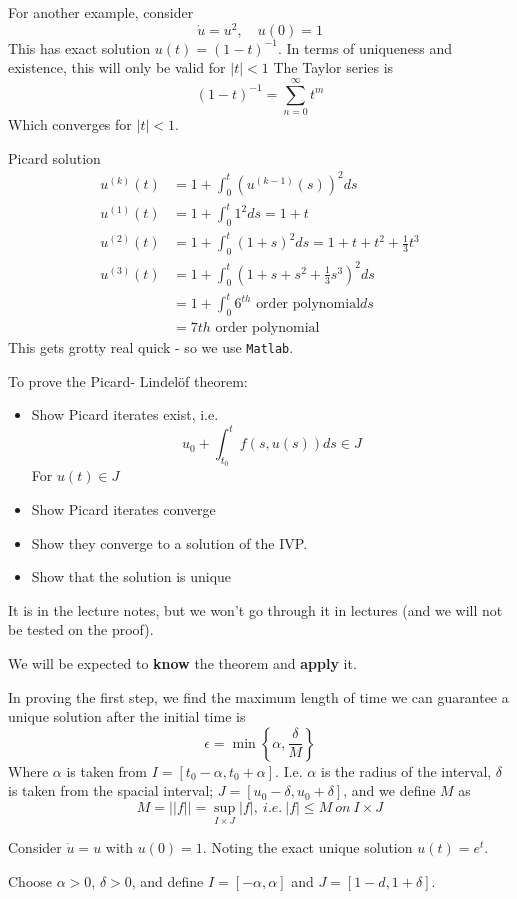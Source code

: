 \documentclass{/home/janmebows/Documents/LatexTemplates/myassignment}
\begin{document}
For another example, consider 
\[\dot u = u^2,\quad u(0)=1\]
This has exact solution $u(t) = (1-t)^{-1}$.
In terms of uniqueness and existence, this will only be valid for $|t| <1$
The Taylor series is
\[(1-t)^{-1} = \sum_{n=0}^\infty t^m\]
Which converges for $|t|<1$.

Picard solution
\begin{align*}
    u^{(k)}(t) &= 1 + \int_0^t \left(u^{(k-1)}(s)\right)^2 ds\\
    u^{(1)}(t) &= 1 + \int_0^t 1^2 ds = 1 + t\\
    u^{(2)}(t) &= 1 + \int_0^t (1+s)^2 ds = 1 + t + t^2 + \frac13 t^3\\
    u^{(3)}(t) &= 1 + \int_0^t (1+s+s^2+\frac13 s^3)^2 ds\\
            &= 1 +\int_0^t 6^{th}\text{ order polynomial} ds\\
            &= 7{th}\text{ order polynomial}
\end{align*}
This gets grotty real quick - so we use \verb|Matlab|.

To prove the Picard- Lindel\"of theorem:
\begin{itemize}
    \item Show Picard iterates exist, i.e. 
    \[u_0 + \int_{t_0}^t f(s,u(s)) ds \in J\] 
    For $u(t) \in J$
    \item Show Picard iterates converge
    \item Show they converge to a solution of the IVP.
    \item Show that the solution is unique
\end{itemize}
It is in the lecture notes, but we won't go through it in lectures (and we will not be tested on the proof).

We will be expected to \textbf{know} the theorem and \textbf{apply} it.

In proving the first step, we find the maximum length of time we can guarantee a unique solution after the initial time is 
\[\epsilon = \min\left\{\alpha,\frac{\delta}{M}\right\}\]
Where $\alpha$ is taken from $I = [t_0 - \alpha, t_0 + \alpha]$. I.e. $\alpha$ is the radius of the interval, $\delta$ is taken from the spacial interval; $J = [u_0 - \delta, u_0 + \delta]$, and we define $M$ as
\[M = ||f|| = \sup_{I\times J} |f|, \ i.e. \ |f| \leq M \ on \ I\times J\]

Consider $\dot u = u$ with $u(0) =1$. Noting the exact unique solution $u(t) = e^t$.

Choose $\alpha >0$, $\delta > 0$, and define $I = [-\alpha,\alpha]$ and $J = [1-d    ,1+\delta]$.
\end{document}
